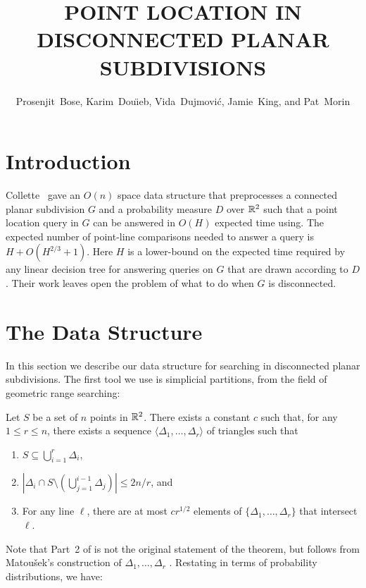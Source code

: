 \documentclass{patmorin}
\title{\MakeUppercase{Point Location in Disconnected Planar Subdivisions}}
\author{Prosenjit~Bose, 
	Karim~Dou\"{\i}eb, 
	Vida~Dujmovi\'c, 
	Jamie~King, and 
	Pat~Morin}
\begin{document}
\maketitle

\section{Introduction}


Collette \etal\ gave an $O(n)$ space data structure that preprocesses
a connected planar subdivision $G$ and a probability measure $D$ over
$\mathbb{R}^2$ such that a point location query in $G$ can be answered in $O(H)$
expected time using.  The expected number of point-line comparisons needed
to answer a query is $H + O(H^{2/3}+1)$.  Here $H$ is a lower-bound on
the expected time required by any linear decision tree for answering
queries on $G$ that are drawn according to $D$. Their work leaves open
the problem of what to do when $G$ is disconnected.


\section{The Data Structure}

In this section we describe our data structure for searching in
disconnected planar subdivisions.  The first tool we use is simplicial
partitions, from the field of geometric range searching:

\begin{thm}[Matou\v{s}ek 1991]
Let $S$ be a set of $n$ points in $\mathbb{R}^2$. There exists a constant
$c$ such that, for any $1\le r \le n$, there exists a sequence
$\langle \Delta_1,\ldots,\Delta_r\rangle$ of triangles such that
  \begin{enumerate}
    \item $S\subseteq \bigcup_{i=1}^r \Delta_i$,
  
    \item $\left|\Delta_i \cap S\setminus
    \left(\bigcup_{j=1}^{i-1}\Delta_j\right)\right| \le 2n/r$, and
  
    \item For any line $\ell$, there are at most $cr^{1/2}$ elements of
  $\{\Delta_1,\ldots,\Delta_r\}$ that intersect $\ell$.
  \end{enumerate}
\end{thm}

Note that Part~2 of  is not the original
statement of the theorem, but follows from Matou\v{s}ek's construction
of $\Delta_1,\ldots,\Delta_r$ \cite{m91}.
Restating  in terms of probability distributions,
we have:
\end{document}
